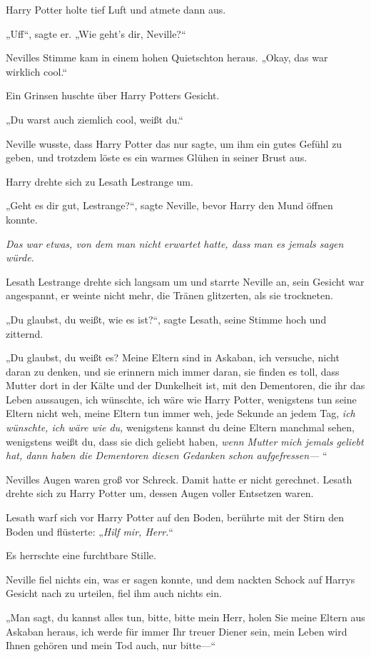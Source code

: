 {Harry Potter holte tief Luft und atmete dann aus.

„Uff“, sagte er. „Wie geht's dir, Neville?“

Nevilles Stimme kam in einem hohen Quietschton heraus. „Okay, das war wirklich cool.“

Ein Grinsen huschte über Harry Potters Gesicht.

„Du warst auch ziemlich cool, weißt du.“

Neville wusste, dass Harry Potter das nur sagte, um ihm ein gutes Gefühl zu geben, und trotzdem löste es ein warmes Glühen in seiner Brust aus.

Harry drehte sich zu Lesath Lestrange um.

„Geht es dir gut, Lestrange?“, sagte Neville, bevor Harry den Mund öffnen konnte.

\emph{Das war etwas, von dem man nicht erwartet hatte, dass man es jemals sagen würde.}

Lesath Lestrange drehte sich langsam um und starrte Neville an, sein Gesicht war angespannt, er weinte nicht mehr, die Tränen glitzerten, als sie trockneten.

„Du glaubst, du weißt, wie es ist?“, sagte Lesath, seine Stimme hoch und zitternd.

„Du glaubst, du weißt es? Meine Eltern sind in Askaban, ich versuche, nicht daran zu denken, und sie erinnern mich immer daran, sie finden es toll, dass Mutter dort in der Kälte und der Dunkelheit ist, mit den Dementoren, die ihr das Leben aussaugen, ich wünschte, ich wäre wie Harry Potter, wenigstens tun seine Eltern nicht weh, meine Eltern tun immer weh, jede Sekunde an jedem Tag, \emph{ich wünschte, ich wäre wie du,} wenigstens kannst du deine Eltern manchmal sehen, wenigstens weißt du, dass sie dich geliebt haben, \emph{wenn Mutter mich jemals geliebt hat, dann haben die Dementoren diesen Gedanken schon aufgefressen—} “

Nevilles Augen waren groß vor Schreck. Damit hatte er nicht gerechnet. Lesath drehte sich zu Harry Potter um, dessen Augen voller Entsetzen waren.

Lesath warf sich vor Harry Potter auf den Boden, berührte mit der Stirn den Boden und flüsterte: „\emph{Hilf mir, Herr.}“

Es herrschte eine furchtbare Stille.

Neville fiel nichts ein, was er sagen konnte, und dem nackten Schock auf Harrys Gesicht nach zu urteilen, fiel ihm auch nichts ein.

„Man sagt, du kannst alles tun, bitte, bitte mein Herr, holen Sie meine Eltern aus Askaban heraus, ich werde für immer Ihr treuer Diener sein, mein Leben wird Ihnen gehören und mein Tod auch, nur bitte—“

}
